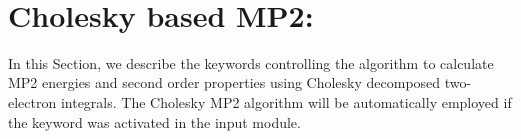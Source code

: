 ~%
\section{Cholesky based MP2: }
\label{sec:chomp2}

In this Section, we describe the keywords controlling the algorithm to 
calculate MP2 energies and  second order properties using Cholesky 
decomposed two-electron integrals. The Cholesky MP2 algorithm will be
automatically employed if the keyword  was activated in the
 input module.  


\begin{center}
\end{center}

